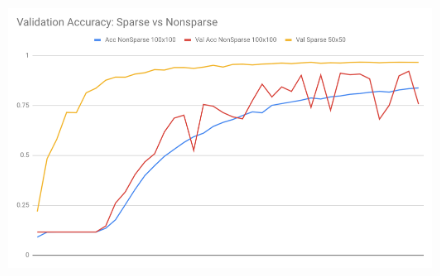 \documentclass[12pt, a4paper, twocolumn, fullpage]{article}
\theoremstyle{plain}
\theoremstyle{definition}
\theoremstyle{remark}
\begin{document}
	\begin{figure}[t]
	  \includegraphics[width=\linewidth]{ValAccSparsevsNonsparse.png}
	  \caption{}
	  \label{fig:network}
	\end{figure}


%
%
%
%
%
%
%
\end{document}
